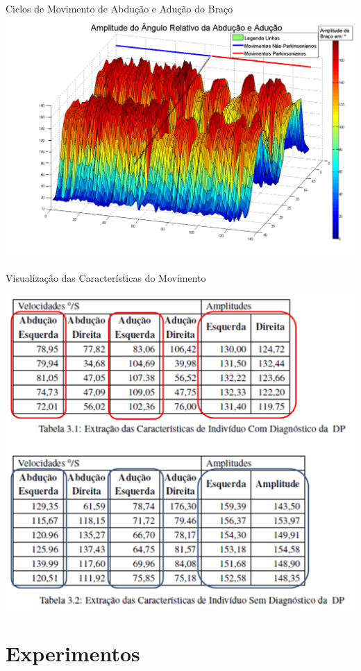 \documentclass{beamer}
\begin{document}
\begin{frame}{Ciclos de Movimento de Abdução e Adução do Braço}
      \center \includegraphics[height=3 in]{img/ciclosmovimentokinnect-2.png}
\end{frame}


\begin{frame}{Visualização das Características do Movimento}
  \begin{block}{}
      \center \includegraphics[height=2.8 in]{img/caracteristicas-tabela.png}
  \end{block}
\end{frame}

\section{Experimentos}
\end{document}
